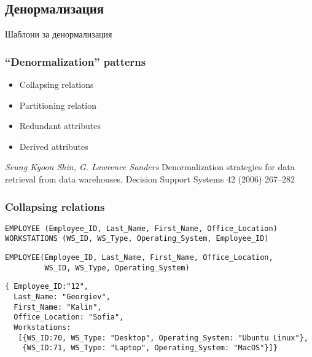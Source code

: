 \documentclass{beamer}
\begin{document}
\subsection{Денормализация}

\begin{frame}
\centerline{Шаблони за денормализация}
\end{frame}


\begin{frame}[fragile]
\frametitle{``Denormalization'' patterns}


\begin{itemize}
  \item Collapsing relations
  \item Partitioning relation
  \item Redundant attributes
  \item Derived attributes
\end{itemize}

\vspace{\baselineskip}
\vspace{\baselineskip}

\textit {Seung Kyoon Shin, G. Lawrence Sanders} Denormalization strategies for data retrieval from data warehouses, Decision Support Systems 42 (2006) 267–282

\end{frame}


\begin{frame}[fragile]
\frametitle{Collapsing relations}



\begin{verbatim}
EMPLOYEE (Employee_ID, Last_Name, First_Name, Office_Location)
WORKSTATIONS (WS_ID, WS_Type, Operating_System, Employee_ID)
\end{verbatim}


\begin{verbatim}
EMPLOYEE(Employee_ID, Last_Name, First_Name, Office_Location, 
         WS_ID, WS_Type, Operating_System)
\end{verbatim}

\begin{verbatim}
{ Employee_ID:"12", 
  Last_Name: "Georgiev", 
  First_Name: "Kalin",
  Office_Location: "Sofia",
  Workstations:
   [{WS_ID:70, WS_Type: "Desktop", Operating_System: "Ubuntu Linux"},
    {WS_ID:71, WS_Type: "Laptop", Operating_System: "MacOS"}]}
\end{verbatim}

\end{frame}
\end{document}
